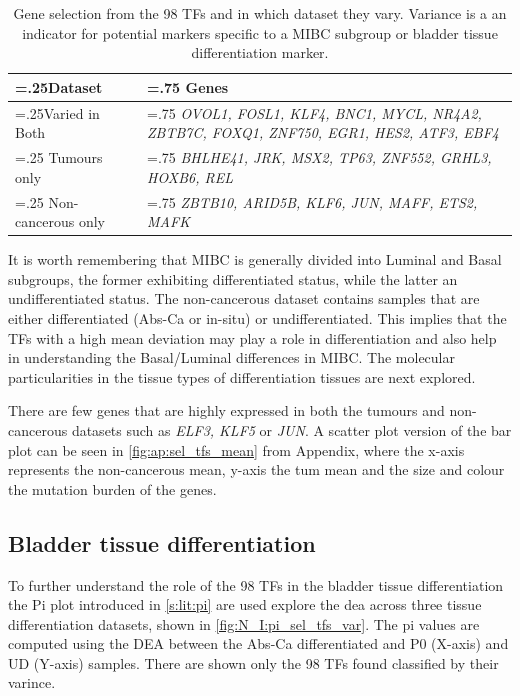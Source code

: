 \begin{table}[!htb]
  \centering
  \scriptsize
  \begin{tabularx}{\textwidth}{>{\hsize=.25\hsize}X|>{\hsize=.75\hsize}X}
    \toprule
    \textbf{Dataset} & \textbf{Genes} \\
    \midrule
    Varied in Both & \textit{OVOL1, FOSL1, KLF4, BNC1, MYCL, NR4A2, ZBTB7C, FOXQ1, ZNF750, EGR1, HES2, ATF3, EBF4} \\
    \midrule
    Tumours only & \textit{BHLHE41, JRK, MSX2, TP63, ZNF552, GRHL3, HOXB6, REL} \\
    \midrule
    Non-cancerous only & \textit{ZBTB10, ARID5B, KLF6, JUN, MAFF, ETS2, MAFK} \\
    \bottomrule
  \end{tabularx}
    \caption{Gene selection from the 98 TFs and in which dataset they vary. Variance is a an indicator for potential markers specific to a MIBC subgroup or bladder tissue differentiation marker.}
    \label{tab:N_I:sel_tfs_var}
\end{table}

It is worth remembering that MIBC is generally divided into Luminal and Basal subgroups, the former exhibiting differentiated status, while the latter an undifferentiated status. The non-cancerous dataset contains samples that are either differentiated (Abs-Ca or in-situ) or undifferentiated. This implies that the TFs with a high mean deviation may play a role in differentiation and also help in understanding the Basal/Luminal differences in MIBC. The molecular particularities in the tissue types of differentiation tissues are next explored.

There are few genes that are highly expressed in both the tumours and non-cancerous datasets such as \textit{ELF3, KLF5} or \textit{JUN}. A scatter plot version of the bar plot can be seen in \cref{fig:ap:sel_tfs_mean} from Appendix, where the x-axis represents the non-cancerous mean, y-axis the tum mean and the size and colour the mutation burden of the genes.

\subsection{Bladder tissue differentiation} \label{s:N:sel_tf_diff_status}


To further understand the role of the 98 TFs in the bladder tissue differentiation the Pi plot introduced in \cref{s:lit:pi} are used explore the \acrfull{dea} across three tissue differentiation datasets, shown in \cref{fig:N_I:pi_sel_tfs_var}. The pi values are computed using the DEA between the Abs-Ca differentiated and P0 (X-axis) and UD (Y-axis) samples. There are shown only the 98 TFs found classified by their varince.

